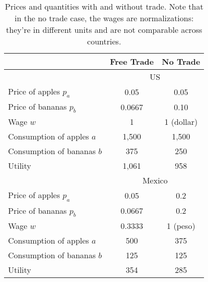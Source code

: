 \documentclass[letterpaper,12pt]{article}
\begin{document}
\begin{table}[h]
\begin{center}

\begin{tabular}{||l|c|c||}
\hline\hline%
                                  &      Free Trade     &    No Trade    \\%
\hline
                                  & \multicolumn{2}{c||}{US} \\
\hline%
Price of apples $p_{a}$           &         0.05        &      0.05      \\%
\hline%
Price of bananas $p_{b}$          &         0.0667      &      0.10      \\%
\hline%
Wage $w$                          &          1          &      1 (dollar)      \\%
\hline%
Consumption of apples $a$         &          1,500      &      1,500      \\%
\hline%
Consumption of bananas $b$        &          375        &     250      \\%
\hline%
Utility                           &          1,061      &      958      \\%
\hline
                                  & \multicolumn{2}{c||}{Mexico} \\
\hline%
Price of apples $p_{a}$           &         0.05        &      0.2      \\%
\hline%
Price of bananas $p_{b}$          &          0.0667     &      0.2      \\%
\hline%
Wage $w$                          &          0.3333     &      1 (peso)      \\%
\hline%
Consumption of apples $a$         &          500        &      375      \\%
\hline%
Consumption of bananas $b$        &          125       &       125      \\%
\hline%
Utility                           &          354       &       285      \\%
\hline\hline%
\end{tabular}

\bigskip

\caption{Prices and quantities with and without trade.
Note that in the no trade case, the wages are normalizations:
they're in different units and are not comparable across countries.}
\label{tab:price_quant}
\end{center}
\end{table}
\end{document}

